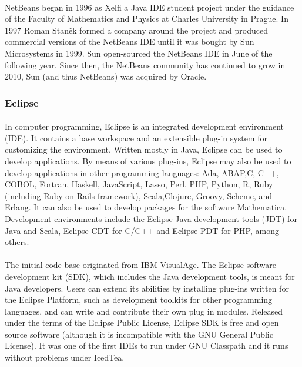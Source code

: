 \paragraph{}
NetBeans began in 1996 as Xelfi  a Java IDE student project under the guidance of the Faculty of Mathematics and Physics at Charles University in Prague. In 1997 Roman Staněk formed a company around the project and produced commercial versions of the NetBeans IDE until it was bought by Sun Microsystems in 1999. Sun open-sourced the NetBeans IDE in June of the following year. Since then, the NetBeans community has continued to grow  in 2010, Sun (and thus NetBeans) was acquired by Oracle.
\subsubsection{Eclipse}
\paragraph{}
In computer programming, Eclipse is an integrated development environment (IDE). It contains a base workspace and an extensible plug-in system for customizing the environment. Written mostly in Java, Eclipse can be used to develop applications. By means of various plug-ins, Eclipse may also be used to develop applications in other programming languages: Ada, ABAP,C, C++, COBOL, Fortran, Haskell, JavaScript, Lasso, Perl, PHP, Python, R, Ruby (including Ruby on Rails framework), Scala,Clojure, Groovy, Scheme, and Erlang. It can also be used to develop packages for the software Mathematica. Development environments include the Eclipse Java development tools (JDT) for Java and Scala, Eclipse CDT for C/C++ and Eclipse PDT for PHP, among others.
\paragraph{}
The initial code base originated from IBM VisualAge. The Eclipse software development kit (SDK), which includes the Java development tools, is meant for Java developers. Users can extend its abilities by installing plug-ins written for the Eclipse Platform, such as development toolkits for other programming languages, and can write and contribute their own plug in modules.
Released under the terms of the Eclipse Public License, Eclipse SDK is free and open source software (although it is incompatible with the GNU General Public License). It was one of the first IDEs to run under GNU Classpath and it runs without problems under IcedTea.
